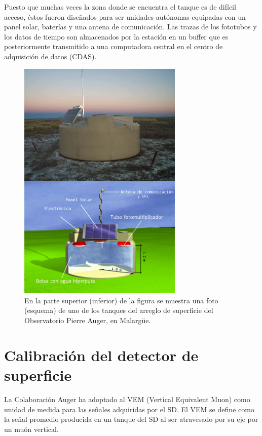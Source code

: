 	Puesto que muchas veces la zona donde se encuentra el tanque es de dif\'icil acceso, \'estos fueron diseñados para ser unidades aut\'onomas equipadas con un panel solar, bater\'ias y una antena de comunicaci\'on.
	Las trazas de los fototubos y los datos de tiempo son almacenados por la estaci\'on en un buffer que es posteriormente transmitido a una computadora central en el centro de adquisici\'on de datos (CDAS).
	
	\begin{figure}[h!]
		\begin{center}
		\includegraphics[width=0.7\textwidth]{fig/detectorAuger/Tanque00}
		\caption{\label{fig:tanque} En la parte superior (inferior) de la figura se muestra una foto (esquema) de uno de los tanques del arreglo de superficie del Observatorio Pierre Auger, en Malarg\"ue.}
		\end{center}
	\end{figure}

		\section{Calibraci\'on del detector de superficie}
		
		La Colaboraci\'on Auger ha adoptado al VEM (Vertical Equivalent Muon) como unidad de medida para las señales adquiridas por el SD.
		El VEM se define como la señal promedio producida en un tanque del SD al ser atravesado por su eje por un mu\'on vertical.
		
